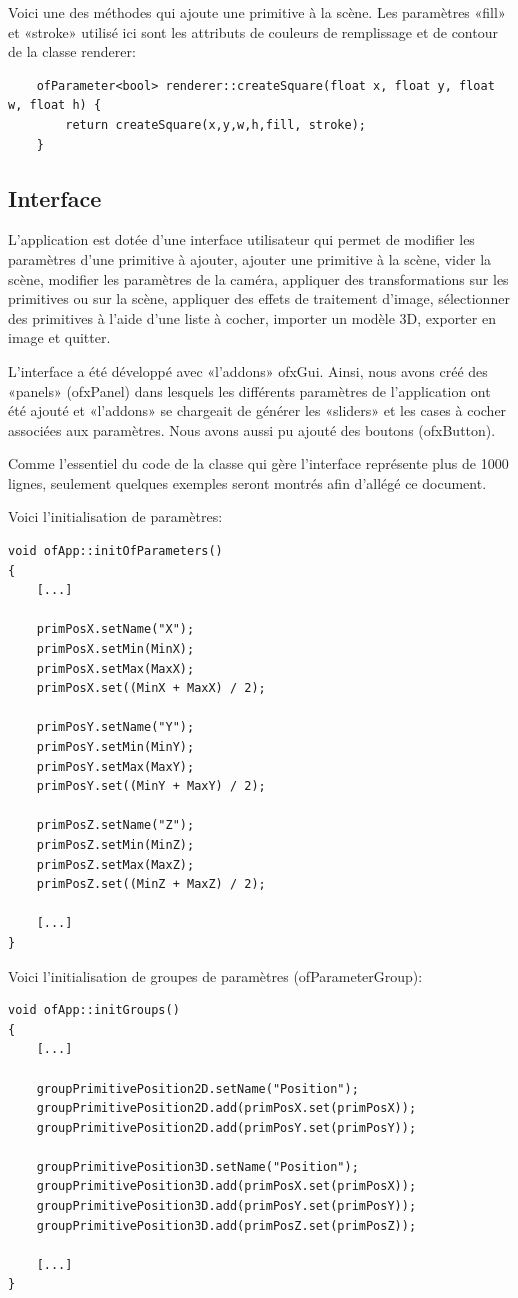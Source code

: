 Voici une des méthodes qui ajoute une primitive à la scène. Les paramètres «fill» et «stroke» utilisé ici sont les attributs de couleurs de remplissage et de contour de la classe renderer:
\begin{lstlisting}
	ofParameter<bool> renderer::createSquare(float x, float y, float w, float h) {
		return createSquare(x,y,w,h,fill, stroke);
	}
\end{lstlisting}

\subsection{Interface}
L'application est dotée d'une interface utilisateur qui permet de modifier les paramètres d'une primitive à ajouter, ajouter une primitive à la scène, vider la scène, modifier les paramètres de la caméra, appliquer des transformations sur les primitives ou sur la scène, appliquer des effets de traitement d'image, sélectionner des primitives à l'aide d'une liste à cocher, importer un modèle 3D, exporter en image et quitter. 

L'interface a été développé avec «l'addons» ofxGui. Ainsi, nous avons créé des «panels» (ofxPanel) dans lesquels les différents paramètres de l'application ont été ajouté et «l'addons» se chargeait de générer les «sliders» et les cases à cocher associées aux paramètres. Nous avons aussi pu ajouté des boutons (ofxButton).

Comme l'essentiel du code de la classe qui gère l'interface représente plus de 1000 lignes, seulement quelques exemples seront montrés afin d'allégé ce document.

Voici l'initialisation de paramètres:
\begin{lstlisting}
void ofApp::initOfParameters() 
{
	[...]
	
	primPosX.setName("X");
	primPosX.setMin(MinX);
	primPosX.setMax(MaxX);
	primPosX.set((MinX + MaxX) / 2);
	
	primPosY.setName("Y");
	primPosY.setMin(MinY);
	primPosY.setMax(MaxY);
	primPosY.set((MinY + MaxY) / 2);
	
	primPosZ.setName("Z");
	primPosZ.setMin(MinZ);
	primPosZ.setMax(MaxZ);
	primPosZ.set((MinZ + MaxZ) / 2);
	
	[...]
}
\end{lstlisting}

Voici l'initialisation de groupes de paramètres (ofParameterGroup):
\begin{lstlisting}
void ofApp::initGroups()
{
	[...]
	
	groupPrimitivePosition2D.setName("Position");
	groupPrimitivePosition2D.add(primPosX.set(primPosX));
	groupPrimitivePosition2D.add(primPosY.set(primPosY));
	
	groupPrimitivePosition3D.setName("Position");
	groupPrimitivePosition3D.add(primPosX.set(primPosX));
	groupPrimitivePosition3D.add(primPosY.set(primPosY));
	groupPrimitivePosition3D.add(primPosZ.set(primPosZ));
	
	[...]
}
\end{lstlisting}

